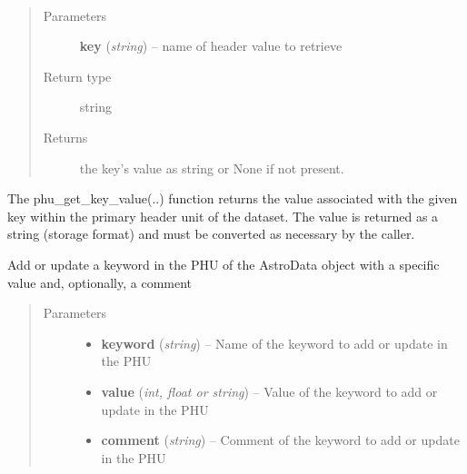 \documentclass[letterpaper,10pt,english]{sphinxmanual}
\begin{document}
\begin{fulllineitems}
\label{chapter_AstroDataClass:astrodata.data.AstroData.phu_get_key_value}~\begin{quote}\begin{description}
\item[{Parameters}] \leavevmode
\textbf{key} (\emph{string}) -- name of header value to retrieve

\item[{Return type}] \leavevmode
string

\item[{Returns}] \leavevmode
the key's value as string or None if not present.

\end{description}\end{quote}

The phu\_get\_key\_value(..) function returns the value associated with the
given key within the primary header unit
of the dataset. The value is returned as a string (storage format)
and must be converted as necessary by the caller.

\end{fulllineitems}



\begin{fulllineitems}
\label{chapter_AstroDataClass:astrodata.data.AstroData.phu_set_key_value}
Add or update a keyword in the PHU of the AstroData object with a
specific value and, optionally, a comment
\begin{quote}\begin{description}
\item[{Parameters}] \leavevmode\begin{itemize}
\item {} 
\textbf{keyword} (\emph{string}) -- Name of the keyword to add or update in the PHU

\item {} 
\textbf{value} (\emph{int, float or string}) -- Value of the keyword to add or update in the PHU

\item {} 
\textbf{comment} (\emph{string}) -- Comment of the keyword to add or update in the PHU

\end{itemize}

\end{description}\end{quote}

\end{fulllineitems}
\end{document}
